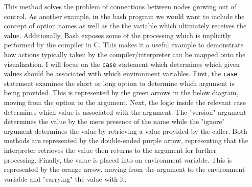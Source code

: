 
This method solves the problem of connections between nodes growing out of control.
As another example, in the bash program we would want to include the concept of option
names as well as the the variable which ultimately receives the value.
Additionally, Bash exposes some of the processing which is implicitly performed by the
compiler in C.
This makes it a useful example to demonstrate how actions typically taken by the
compiler/interpreter can be mapped onto the visualization.
I will focus on the \texttt{case} statement which determines which given values should be
associated with which environment variables.
First, the \texttt{case} statement examines the short or long option to determine which
argument is being provided.
This is represented by the green arrows in the below diagram, moving from the option to
the argument.
Next, the logic inside the relevant case determines which value is associated with the
argument.
The "version" argument determines the value by the mere presence of the name while the
"ignore" argument determines the value by retrieving a value provided by the caller.
Both methods are represented by the double-ended purple arrow, representing that the
interpreter retrieves the value then returns to the argument for further processing.
Finally, the value is placed into an environment variable.
This is represented by the orange arrow, moving from the argument to the environment
variable and "carrying" the value with it.


